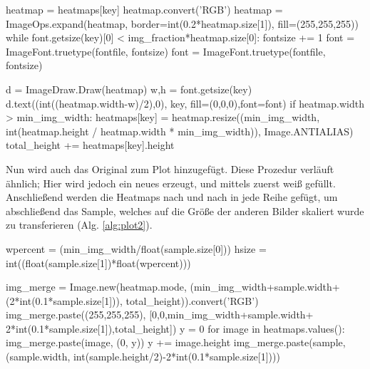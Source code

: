 \begin{python}[caption={Generierung von Heatmaps in Abhängigkeit vom Layer, dem Sample und den Konzepten  (Auszug aus der Methode \lstinline{plot_imgs()})}, label=alg:plot1]
heatmap = heatmaps[key]
heatmap.convert('RGB')
heatmap = ImageOps.expand(heatmap, border=int(0.2*heatmap.size[1]), 
                                            fill=(255,255,255))                                           
while font.getsize(key)[0] < img_fraction*heatmap.size[0]:
    fontsize += 1
    font = ImageFont.truetype(fontfile, fontsize)   
font = ImageFont.truetype(fontfile, fontsize)

d = ImageDraw.Draw(heatmap)
w,h = font.getsize(key)
d.text((int((heatmap.width-w)/2),0), key, fill=(0,0,0),font=font)
if heatmap.width > min_img_width:
    heatmaps[key] = heatmap.resize((min_img_width, 
                            int(heatmap.height / heatmap.width * min_img_width)), 
                                Image.ANTIALIAS)
total_height += heatmaps[key].height
\end{python}

\newpage
Nun wird auch das Original zum Plot hinzugefügt. Diese Prozedur verläuft ähnlich; 
Hier wird jedoch ein neues  erzeugt, und mittels  zuerst weiß gefüllt. Anschließend werden die Heatmaps nach und nach in jede Reihe gefügt, um abschließend das Sample, welches auf die Größe der anderen Bilder skaliert wurde zu transferieren (Alg. \ref{alg:plot2}).

\begin{python}[caption={Befüllen eines \lstinline{Pil.Image} anhand der Heatmaps und des Originals (Auszug aus der Methode \lstinline{plot_imgs()})}, label=alg:plot2]
wpercent = (min_img_width/float(sample.size[0]))
hsize = int((float(sample.size[1])*float(wpercent)))

img_merge = Image.new(heatmap.mode, (min_img_width+sample.width+
                                    (2*int(0.1*sample.size[1])), 
                                    total_height)).convert('RGB')
img_merge.paste((255,255,255), [0,0,min_img_width+sample.width+
                                2*int(0.1*sample.size[1]),total_height])
y = 0
for image in heatmaps.values():
    img_merge.paste(image, (0, y))
    y += image.height
img_merge.paste(sample, (sample.width, 
                            int(sample.height/2)-2*int(0.1*sample.size[1])))
\end{python}




